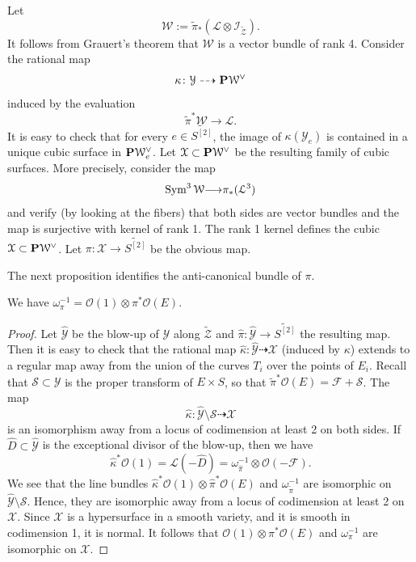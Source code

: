 \documentclass[12pt,reqno]{amsart}
\renewcommand{\to}{{\longrightarrow}}
\numberwithin{equation}{section}
\renewcommand{\O}{\mathcal O}
\begin{document}
Let
\[
\mathcal W := \widetilde \pi_* \left( \mathcal L \otimes \mathcal I_{\widetilde{\mathcal Z}} \right).
\]
It follows from Grauert's theorem that $\mathcal W$ is a vector bundle of rank 4.
Consider the rational map
\[ \kappa \colon \mathcal Y \dashrightarrow \P \mathcal W^\vee\]
induced by the evaluation
\[ \widetilde \pi^* \mathcal W \to \mathcal L.\]
It is easy to check that for every $e \in \widetilde{S^{[2]}}$, the image of $\kappa(\mathcal Y_e)$ is contained in a unique cubic surface in $\P \mathcal W^\vee_e$.
Let $\mathcal X \subset \P \mathcal W^\vee$ be the resulting family of cubic surfaces.
More precisely, consider the map
\[ \Sym^3 \mathcal W \to \pi_*(\mathcal L^3)\]
and verify (by looking at the fibers) that both sides are vector bundles and the map is surjective with kernel of rank 1.
The rank 1 kernel defines the cubic $\mathcal X \subset \P \mathcal W^\vee$.
Let $\pi \colon \mathcal X \to \widetilde{S^{[2]}}$ be the obvious map.

The next proposition identifies the anti-canonical bundle of $\pi$.
\begin{proposition}
  We have $\omega_\pi^{-1} = \O(1) \otimes \pi^*\O(E)$.
\end{proposition}
\begin{proof}
  Let $\widehat {\mathcal Y}$ be the blow-up of $\mathcal Y$ along $\widetilde{\mathcal Z}$ and $\widehat \pi \colon \widehat{\mathcal Y} \to \widetilde{S^{[2]}}$ the resulting map.
  Then it is easy to check that the rational map $\widehat\kappa \colon \widehat {\mathcal Y} \dashrightarrow \mathcal X$ (induced by $\kappa$) extends to a regular map away from the union of the curves $T_i$ over the points of $E_i$.
  Recall that $\mathcal S \subset \mathcal Y$ is the proper transform of $E \times S$, so that $\widetilde \pi^* \O(E) = \mathcal F + \mathcal S$.
  The map
  \[
    \widehat \kappa \colon \widehat {\mathcal Y} \setminus \mathcal S \dashrightarrow \mathcal X
  \]
  is an isomorphism away from a locus of codimension at least 2 on both sides.
  If $\widehat D \subset \widehat {\mathcal Y}$ is the exceptional divisor of the blow-up, then we have
  \[\widehat \kappa ^* \O(1) = \mathcal L(-\widehat D) = \omega_{\widehat \pi}^{-1} \otimes \O(-\mathcal F).
  \]
  We see that the line bundles $\widehat \kappa^* \O(1) \otimes \widehat \pi^* \O(E)$ and $\omega_{\widetilde \pi}^{-1}$ are isomorphic on $\widehat {\mathcal Y} \setminus \mathcal S$.
  Hence, they are isomorphic away from a locus of codimension at least 2 on $\mathcal X$.
  Since $\mathcal X$ is a hypersurface in a smooth variety, and it is smooth in codimension 1, it is normal.
  It follows that $\O(1) \otimes \pi^* \O(E)$ and $\omega_\pi^{-1}$ are isomorphic on $\mathcal X$.
\end{proof}
\end{document}
